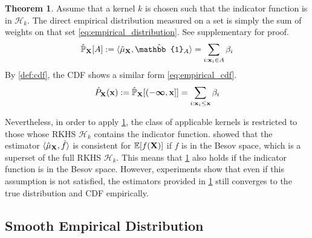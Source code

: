 \documentclass[twoside]{article} \usepackage{aistats2017}
\theoremstyle{definition}
\theoremstyle{theorem}
\newtheorem{theorem}{Theorem}[section]
\newcommand{\rv}[1]{{#1}}
\newcommand{\inner}[2]{{\langle #1, #2 \rangle}}
\begin{document}
		\begin{theorem} \label{thm:empirical_distribution_and_cdf}
			Assume that a kernel $k$ is chosen such that the indicator function is in $\mathcal{H}_{k}$. The direct empirical distribution measured on a set is simply the sum of weights on that set \eqref{eq:empirical_distribution}. See supplementary for proof.
			\begin{equation}
				\hat{\mathbb{P}}_{\bvec{\rv{X}}}[A] := \inner{\hat{\mu}_{\bvec{\rv{X}}}}{ \hat{\mathbb{1}}_{A}} = \sum_{i : \bvec{x}_{i} \in A} \beta_{i}
			\label{eq:empirical_distribution}
			\end{equation}
			By \cref{def:cdf}, the CDF shows a similar form \eqref{eq:empirical_cdf}.
			\begin{equation}
				\hat{P}_{\bvec{\rv{X}}}(\bvec{x}) := \hat{\mathbb{P}}_{\bvec{\rv{X}}}[(-\bm{\infty}, \bvec{x}]] = \sum_{i : \bvec{x}_{i} \leq \bvec{x}} \beta_{i}
			\label{eq:empirical_cdf}
			\end{equation}
		\end{theorem}

		Nevertheless, in order to apply \cref{thm:empirical_distribution_and_cdf}, the class of applicable kernels is restricted to those whose RKHS $\mathcal{H}_{k}$ contains the indicator function. \cite{kanagawa2014recovering} showed that the estimator $\langle \hat{\mu}_{\bvec{\rv{X}}}, \hat{f} \rangle$ is consistent for $\mathbb{E}[f(\bvec{\rv{X}})]$ if $f$ is in the Besov space, which is a superset of the full RKHS $\mathcal{H}_{k}$. This means that \cref{thm:empirical_distribution_and_cdf} also holds if the indicator function is in the Besov space. However, experiments show that even if this assumption is not satisfied, the estimators provided in \cref{thm:empirical_distribution_and_cdf} still converges to the true distribution and CDF empirically.

	\subsection{Smooth Empirical Distribution}
	\label{sec:direct_quantile_regression:smooth_empirical_distribution}
\end{document}
